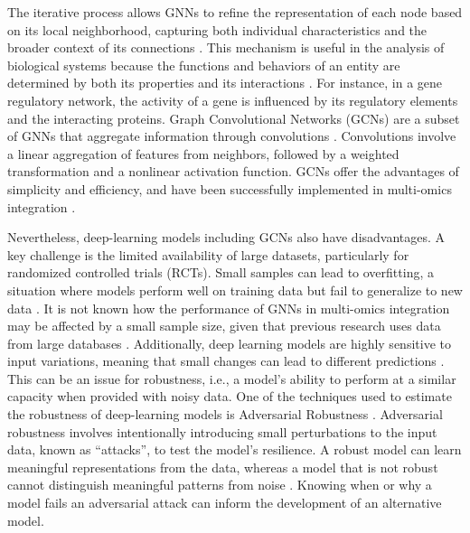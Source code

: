 \documentclass[unnumsec,webpdf,modern,large]{oup-authoring-template}
\theoremstyle{thmstyleone}%
\theoremstyle{thmstyletwo}%
\theoremstyle{thmstylethree}%
\begin{document}
The iterative process allows GNNs to refine the representation of each node based on its local neighborhood, capturing both individual characteristics and the broader context of its connections \cite{Wu2022, Zhang2023}. This mechanism is useful in the analysis of biological systems because the functions and behaviors of an entity are determined by both its properties and its interactions \cite{Althubaiti2021, Song2021, Wang2021}. For instance, in a gene regulatory network, the activity of a gene is influenced by its regulatory elements and the interacting proteins. Graph Convolutional Networks (GCNs) are a subset of GNNs that aggregate information through convolutions \cite{kipf2016semi, tang2022graph}. Convolutions involve a linear aggregation of features from neighbors, followed by a weighted transformation and a nonlinear activation function. GCNs offer the advantages of simplicity and efficiency, and have been successfully implemented in multi-omics integration \cite{Liu2020, Li2021, Gao2023, Schulte2021}. 

Nevertheless, deep-learning models including GCNs also have disadvantages. A key challenge is the limited availability of large datasets, particularly for randomized controlled trials (RCTs). Small samples can lead to overfitting, a situation where models perform well on training data but fail to generalize to new data \cite{Wu2022}. It is not known how the performance of GNNs in multi-omics integration may be affected by a small sample size, given that previous research uses data from large databases \cite{Althubaiti2021, Liu2020, Li2021, Li2022}. Additionally, deep learning models are highly sensitive to input variations, meaning that small changes can lead to different predictions \cite{zugner2020adversarial}. This can be an issue for robustness, i.e., a model’s ability to perform at a similar capacity when provided with noisy data. One of the techniques used to estimate the robustness of deep-learning models is Adversarial Robustness \cite{Günnemann2022}. Adversarial robustness involves intentionally introducing small perturbations to the input data, known as “attacks”, to test the model's resilience. A robust model can learn meaningful representations from the data, whereas a model that is not robust cannot distinguish meaningful patterns from noise \cite{eykholt2018robust}. Knowing when or why a model fails an adversarial attack can inform the development of an alternative model.
\end{document}
